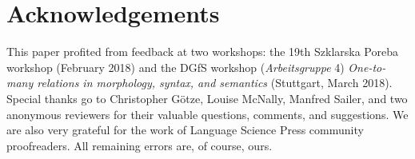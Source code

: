 \documentclass[output=paper]{langsci/langscibook}
\begin{document}
\section*{Acknowledgements}
\begin{sloppypar}
This paper profited from feedback at two workshops: the 19th Szklarska Poreba workshop (February 2018) and the DGfS workshop  (\textit{Arbeitsgruppe} 4) \textit{One-to-many relations in morphology, syntax, and semantics} (Stuttgart, March 2018). Special thanks go to Christopher Götze, Louise McNally, Manfred Sailer, and two anonymous reviewers for their valuable questions, comments, and suggestions. We are also very grateful for the work of Language Science Press community proofreaders. All remaining errors are, of course, ours.
\end{sloppypar}

{\sloppy\printbibliography[heading=subbibliography,notkeyword=this]}
\end{document}
